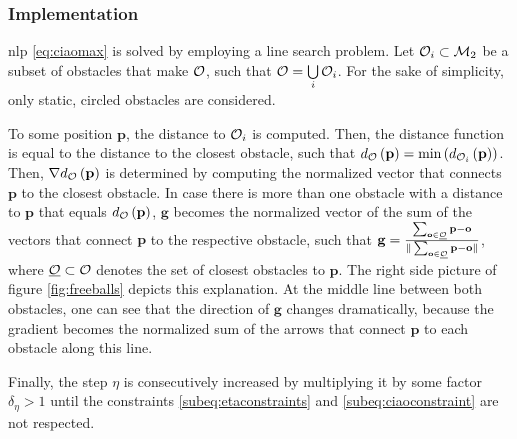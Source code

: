 \subsubsection*{Implementation}

\acrshort{nlp} \eqref{eq:ciaomax} is solved by employing a line search problem. Let $\mathcal{O}_i \subset \mathcal{M}_2$ be a subset of obstacles that make $\mathcal{O}$, such that $\mathcal{O} = \bigcup\limits_{i} \mathcal{O}_i$. For the sake of simplicity, only static, circled obstacles are considered.

To some position $\mathbf{p}$, the distance to $\mathcal{O}_i$ is computed. Then, the distance function is equal to the distance to the closest obstacle, such that $d_{\mathcal{O}}\left(\mathbf{p}\right) = \text{min} \left(d_{\mathcal{O}_i}\left(\mathbf{p}\right)\right)$. Then, $\nabla d_{\mathcal{O}}\left(\mathbf{p}\right)$ is determined by computing the normalized vector that connects $\mathbf{p}$ to the closest obstacle. In case there is more than one obstacle with a distance to $\mathbf{p}$ that equals $d_{\mathcal{O}}\left(\mathbf{p}\right)$, $\mathbf{g}$ becomes the normalized vector of the sum of the vectors that connect $\mathbf{p}$ to the respective obstacle, such that $\mathbf{g} = \frac{\sum_{\mathbf{o} \in \underline{\mathcal{O}}} \mathbf{p} - \mathbf{o}}{\|\sum_{\mathbf{o} \in \underline{\mathcal{O}} } \mathbf{p} - \mathbf{o}\|}$, where $\underline{\mathcal{O}} \subset \mathcal{O}$ denotes the set of closest obstacles to $\mathbf{p}$. The right side picture of figure \ref{fig:freeballs} depicts this explanation. At the middle line between both obstacles, one can see that the direction of $\mathbf{g}$ changes dramatically, because the gradient becomes the normalized sum of the arrows that connect $\mathbf{p}$ to each obstacle along this line.

Finally, the step $\eta$ is consecutively increased by multiplying it by some factor $\delta_{\eta} > 1$ until the constraints \eqref{subeq:etaconstraints} and \eqref{subeq:ciaoconstraint} are not respected.

